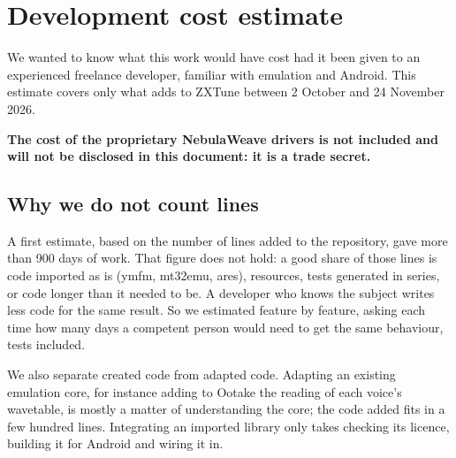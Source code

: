 \chapter{Development cost estimate}\label{chap:chiffrage}

We wanted to know what this work would have cost had it been given to an experienced freelance developer, familiar
with emulation and Android. This estimate covers only what \soft adds to ZXTune between 2 October and
24 November 2026.

\textbf{The cost of the proprietary NebulaWeave drivers is not included and will not be disclosed in this document:
it is a trade secret.}

\section{Why we do not count lines}
A first estimate, based on the number of lines added to the repository, gave more than 900 days of work. That figure
does not hold: a good share of those lines is code imported as is (ymfm, mt32emu, ares), resources, tests generated
in series, or code longer than it needed to be. A developer who knows the subject writes less code for the same
result. So we estimated feature by feature, asking each time how many days a competent person would need to get the
same behaviour, tests included.

We also separate created code from adapted code. Adapting an existing emulation core, for instance adding to Ootake
the reading of each voice's wavetable, is mostly a matter of understanding the core; the code added fits in a few
hundred lines. Integrating an imported library only takes checking its licence, building it for Android and wiring it
in.

